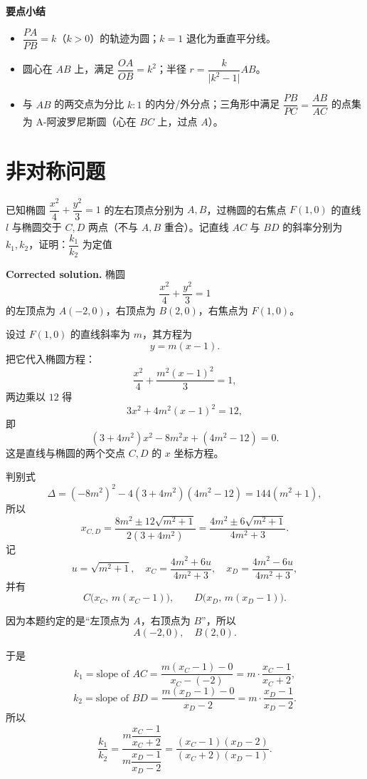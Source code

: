\documentclass{ctexart}
\begin{document}
   \textbf{要点小结}
   \begin{itemize}
   	\item \(\dfrac{PA}{PB}=k\)（\(k>0\)）的轨迹为圆；\(k=1\) 退化为垂直平分线。
   	\item 圆心在 \(AB\) 上，满足 \(\dfrac{OA}{OB}=k^2\)；半径 \(r=\dfrac{k}{\lvert k^2-1\rvert}AB\)。
   	\item 与 \(AB\) 的两交点为分比 \(k:1\) 的内分/外分点；三角形中满足 \(\dfrac{PB}{PC}=\dfrac{AB}{AC}\) 的点集为 A-阿波罗尼斯圆（心在 \(BC\) 上，过点 \(A\)）。
   \end{itemize}
   
   \section{非对称问题}
   
   已知椭圆 \(\dfrac{x^{2}}{4}+\dfrac{y^{2}}{3}=1\) 的左右顶点分别为 \(A,B\)，过椭圆的右焦点 \(F(1,0)\) 的直线 \(l\) 与椭圆交于 \(C,D\) 两点（不与 \(A,B\) 重合）。记直线 \(AC\) 与 \(BD\) 的斜率分别为 \(k_{1},k_{2}\)，证明：\(\dfrac{k_{1}}{k_{2}}\) 为定值
   
   \textbf{Corrected solution.}
   椭圆
   \[
   \frac{x^{2}}{4}+\frac{y^{2}}{3}=1
   \]
   的左顶点为 \(A(-2,0)\)，右顶点为 \(B(2,0)\)，右焦点为 \(F(1,0)\)。
   
   设过 \(F(1,0)\) 的直线斜率为 \(m\)，其方程为
   \[
   y = m(x-1).
   \]
   把它代入椭圆方程：
   \[
   \frac{x^{2}}{4} + \frac{m^{2}(x-1)^{2}}{3} = 1,
   \]
   两边乘以 \(12\) 得
   \[
   3x^{2} + 4m^{2}(x-1)^{2} = 12,
   \]
   即
   \[
   (3+4m^{2})x^{2} - 8m^{2}x + (4m^{2}-12) = 0. \tag{1}
   \]
   这是直线与椭圆的两个交点 \(C,D\) 的 \(x\) 坐标方程。
   
   判别式
   \[
   \Delta = (-8m^{2})^{2} - 4(3+4m^{2})(4m^{2}-12)
   = 144(m^{2}+1),
   \]
   所以
   \[
   x_{C,D}
   = \frac{8m^{2} \pm 12\sqrt{m^{2}+1}}{2(3+4m^{2})}
   = \frac{4m^{2} \pm 6\sqrt{m^{2}+1}}{4m^{2}+3}.
   \]
   记
   \[
   u = \sqrt{m^{2}+1}, \quad
   x_C = \frac{4m^{2}+6u}{4m^{2}+3}, \quad
   x_D = \frac{4m^{2}-6u}{4m^{2}+3},
   \]
   并有
   \[
   C\bigl(x_C,\, m(x_C-1)\bigr), \qquad
   D\bigl(x_D,\, m(x_D-1)\bigr).
   \]
   
   因为本题约定的是“左顶点为 \(A\)，右顶点为 \(B\)”，所以
   \[
   A(-2,0), \quad B(2,0).
   \]
   
   于是
   \[
   k_1 = \text{slope of } AC
   = \frac{m(x_C-1)-0}{x_C - (-2)}
   = m \cdot \frac{x_C - 1}{x_C + 2},
   \]
   \[
   k_2 = \text{slope of } BD
   = \frac{m(x_D-1)-0}{x_D - 2}
   = m \cdot \frac{x_D - 1}{x_D - 2}.
   \]
   所以
   \[
   \frac{k_1}{k_2}
   = \frac{m \dfrac{x_C - 1}{x_C + 2}}{m \dfrac{x_D - 1}{x_D - 2}}
   = \frac{(x_C - 1)(x_D - 2)}{(x_C + 2)(x_D - 1)}. \tag{2}
   \]
   
\end{document}
